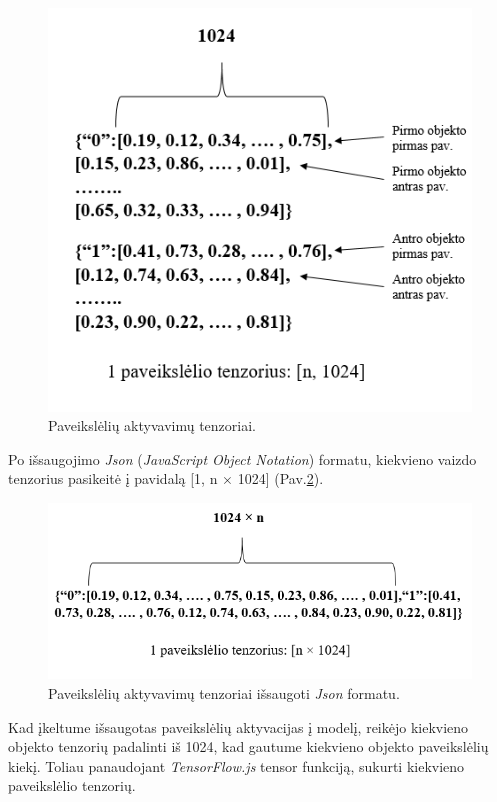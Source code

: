 \documentclass{VUMIFInfKursinis}
\begin{document}
\begin{figure}[h!]
\centering
  \includegraphics[scale=0.9]{img/pav_tensors1.PNG}
  \caption{Paveikslėlių aktyvavimų tenzoriai.}
  \label{fig:image_tensors1}
\end{figure}

Po išsaugojimo \textit{Json} (\textit{JavaScript Object Notation}) formatu, kiekvieno vaizdo tenzorius pasikeitė į pavidalą [1, n $\times$ 1024] (Pav.\ref{fig:image_tensors2}).

\begin{figure}[h!]
\centering
  \includegraphics[scale=0.9]{img/pav_tensors2.PNG}
  \caption{Paveikslėlių aktyvavimų tenzoriai išsaugoti \textit{Json} formatu.}
  \label{fig:image_tensors2}
\end{figure}

Kad įkeltume išsaugotas paveikslėlių aktyvacijas į modelį, reikėjo kiekvieno objekto tenzorių padalinti iš 1024, kad gautume kiekvieno objekto paveikslėlių kiekį. Toliau panaudojant \textit{TensorFlow.js} tensor funkciją, sukurti kiekvieno paveikslėlio tenzorių.
\end{document}
